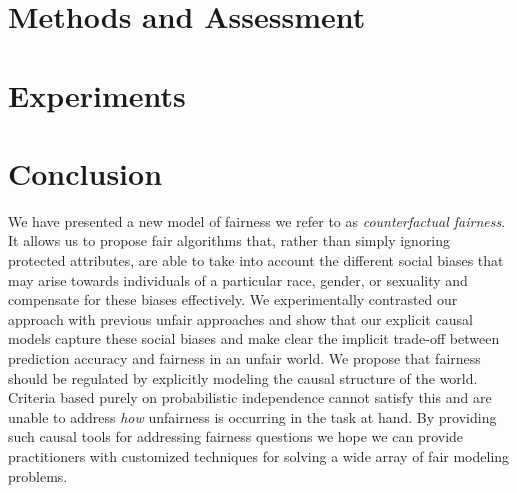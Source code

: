\documentclass{article}
\begin{document}
\section{Methods and Assessment}
\label{sec:methods}


\section{Experiments}
\label{sec:experiments}


\section{Conclusion}
\label{sec:conclusion}
We have presented a new model of fairness we refer to as {\em counterfactual fairness}. It allows us to propose fair
algorithms that, rather than simply ignoring protected attributes, are
able to take into account the different social biases
that may arise towards individuals of a particular race, gender, or
sexuality and compensate for these biases effectively. We
experimentally contrasted our approach with previous unfair
approaches and show that our explicit causal models capture these
social biases and make clear the implicit trade-off between
prediction accuracy and fairness in an unfair world. We propose that fairness should be regulated by explicitly modeling the causal structure of the world. Criteria based purely on probabilistic independence cannot satisfy this and are unable to address \emph{how} unfairness is occurring in the task at hand. By providing such causal tools for addressing fairness questions we hope we can provide practitioners with customized techniques for solving a wide array of fair modeling problems.



\end{document}

